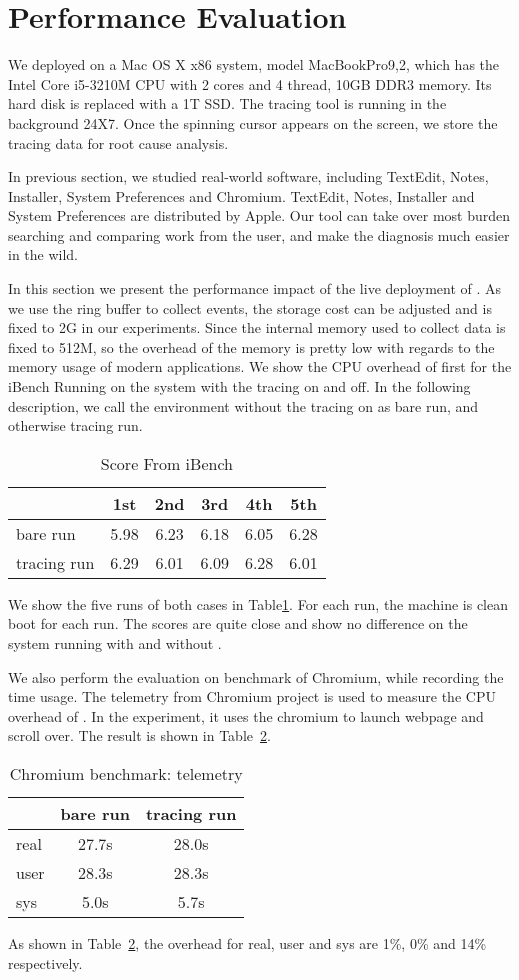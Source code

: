 \section{Performance Evaluation}
\label{sec:evaluation}
We deployed \xxx on a Mac OS X x86 system, model MacBookPro9,2, which has the
Intel Core i5-3210M CPU with 2 cores and 4 thread, 10GB DDR3 memory. Its hard
disk is replaced with a 1T SSD. The tracing tool is running in the background
24X7. Once the spinning cursor appears on the screen, we store the tracing data
for root cause analysis.

In previous section, we studied real-world software, including TextEdit, Notes,
Installer, System Preferences and Chromium. TextEdit, Notes, Installer and
System Preferences are distributed by Apple. Our tool can take over most burden
searching and comparing work from the user, and make the diagnosis much easier
in the wild.

In this section we present the performance impact of the live deployment of
\xxx. As we use the ring buffer to collect events, the storage cost can be
adjusted and is fixed to 2G in our experiments. Since the internal memory used
to collect data is fixed to 512M, so the overhead of the memory is pretty
low with regards to the memory usage of modern applications. We show the CPU
overhead of \xxx first for the iBench Running on the system with the tracing
on and off. In the following description, we call the environment without the
tracing on as bare run, and otherwise tracing run.

\begin{table}[ht]
\begin{tabular}{l|c|c|c|c|c}
\hline
 & 1st & 2nd & 3rd & 4th & 5th\\
\hline
 bare run & 5.98 & 6.23 & 6.18 & 6.05 & 6.28\\
\hline
 tracing run& 6.29 & 6.01 & 6.09 & 6.28 & 6.01\\
\hline
\end{tabular}
\caption{Score From iBench}
\label{tab:ibench}
\end{table}

We show the five runs of both cases in Table\ref{tab:ibench}.
For each run, the machine is clean boot for each run.
The scores are quite close and show no difference on the system running with and without \xxx.

We also perform the evaluation on benchmark of Chromium, while recording the time usage.
The telemetry from Chromium project is used to measure the CPU overhead of \xxx.
In the experiment, it uses the chromium to launch webpage and scroll over.
The result is shown in Table~\ref{tab:chromium benchmark}. 
\begin{table}[ht]
\begin{tabular}{l|c|c}
\hline
 & bare run & tracing run \\
\hline
real & 27.7s & 28.0s \\
\hline
user & 28.3s & 28.3s \\
\hline
sys &  5.0s & 5.7s\\
\hline
\end{tabular}
\caption{Chromium benchmark: telemetry}
\label{tab:chromium benchmark}
\end{table}

As shown in Table~\ref{tab:chromium benchmark}, the overhead for real, user and sys are 1\%, 0\% and
14\% respectively.

